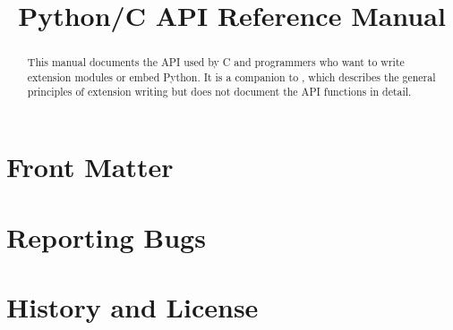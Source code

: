 \documentclass{manual}
\title{Python/C API Reference Manual}
\begin{document}
\maketitle

\ifhtml
\chapter*{Front Matter\label{front}}
\fi



\begin{abstract}

\noindent
This manual documents the API used by C and \Cpp{} programmers who
want to write extension modules or embed Python.  It is a companion to
, which describes the general principles of extension
writing but does not document the API functions in detail.


\end{abstract}

\tableofcontents














\appendix
\chapter{Reporting Bugs}


\chapter{History and License}


\end{document}
